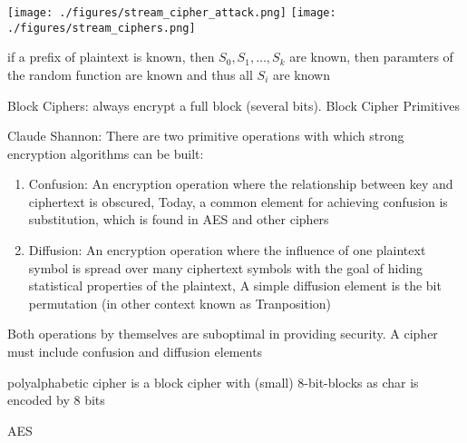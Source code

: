 \documentclass[landscape, a4paper]{article}
\begin{document}
\begin{minipage}[t]{0.2\linewidth}
\begin{betterlist}
\begin{betterlist}
\begin{betterlist}
				\texttt{[image: ./figures/stream\_cipher\_attack.png]}
				\texttt{[image: ./figures/stream\_ciphers.png]}
				\begin{betterlist}
					\item if a prefix of plaintext is known, then $S_0, S_1, \ldots, S_k$ are known, then paramters of the random function are known and thus all $S_i$ are known
				\end{betterlist}
			\end{betterlist}
		\end{betterlist}
	\end{betterlist}
	\begin{betterlist}
		\item \alert{Block Ciphers:} always encrypt a full block (several bits). Block Cipher Primitives
		\begin{betterlist}
			\item \alert{Claude Shannon:} There are two primitive operations with which strong encryption algorithms can be built:
			\begin{enumerate}
				\item \alert{Confusion:} An encryption operation where the \alert{relationship between key and ciphertext is obscured}, Today, a common element for achieving confusion is substitution, which is found in AES and other ciphers
				\item \alert{Diffusion:} An encryption operation where the \alert{influence of one plaintext symbol is spread over many ciphertext symbols} with the goal of hiding statistical properties of the plaintext, A simple diffusion element is the \alert{bit permutation} (in other context known as Tranposition)
			\end{enumerate}
			\begin{betterlist}
				\item Both operations by themselves are suboptimal in providing security. A cipher must include confusion and diffusion elements
			\end{betterlist}
			\item \alert{polyalphabetic cipher} is a block cipher with (small) $8$-bit-blocks as char is encoded by $8$ bits
			\item \alert{AES}

\end{betterlist}
\end{betterlist}
\end{minipage}
\end{document}
